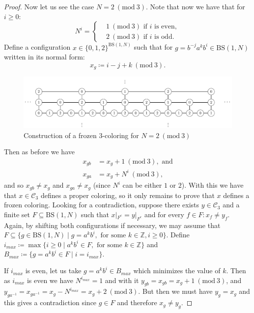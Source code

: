 \documentclass[cupthm,crop,info]{CUP-JNL-ETS}%
\theoremstyle{cupplain}
\theoremstyle{cupdefinition}
\theoremstyle{cupremark}
\theoremstyle{cupproof}
\newtheorem{proof}{Proof}
\numberwithin{equation}{section}
\newcommand{\BS}[1][N]{\mathrm{BS}(1,#1)}
\begin{document}
\begin{proof}
	
	Now let us see the case $N=2\ (\mathrm{mod} \ 3)$. Note that now we have that for $i\ge 0$:
	\begin{equation*}	
	N^i=\left\{ 
	\begin{aligned}
	&1 \ (\mathrm{mod} \ 3) \text{ if }i\text{ is even}, \\
	&2 \ (\mathrm{mod} \ 3) \text{ if }i\text{ is odd.} 
	\end{aligned}
	\right.
	\end{equation*}
	Define a configuration  $x\in \{0,1,2\}^{\BS}$ such that for $g=b^{-j}a^k b^i\in \BS$ written in its normal form:
	$$
	x_g\coloneqq i-j+k \ (\mathrm{mod} \ 3).
	$$
	
	
	\begin{figure}
		\centering
\includegraphics[scale=0.6]{frozen3_n2mod3.pdf}
		\caption{Construction of a frozen $3$-coloring for $N=2\ (\mathrm{mod} \ 3)$}
		\label{fig:gcs_frozen_3_col_N_2}
	\end{figure}	
	
	Then as before we have
	\begin{align*}
	x_{gb}&=x_g+1 \ (\mathrm{mod} \ 3), \text{ and} \\
	x_{ga}&=x_g+N^i \ (\mathrm{mod} \ 3),
	\end{align*}
	and so $x_{gb}\neq x_g$ and $x_{ga}\neq x_g$ (since $N^i$ can be either $1$ or $2$). With this we have that $x\in \mathcal{C}_3$ defines a proper coloring, so it only remains to prove that $x$ defines a frozen coloring. Looking for a contradiction, suppose there exists $y\in \mathcal{C}_3$ and a finite set $F\subseteq \BS$ such that $x|_{F^c}=y|_{F^c}$ and for every $f\in F: x_f\neq y_f$. Again, by shifting both configurations if necessary, we may assume that $F\subseteq \{g\in \BS\mid g=a^kb^i, \text{ for some }k\in \mathbb{Z}, i\ge 0\}$. Define $i_{max}\coloneqq \max\{ i\ge 0\mid a^kb^i\in F, \text{ for some }k\in \mathbb{Z}\}$ and $B_{max}\coloneqq\{g=a^kb^i\in F\mid i=i_{max}\}$.
	
	If $i_{max}$ is even, let us take $g=a^kb^i\in B_{max}$ which minimizes the value of $k$. Then as $i_{max}$ is even we have $N^{i_{max}}=1$ and with it $y_{gb}=x_{gb}=x_g+1  \ (\mathrm{mod} \ 3)$, and $y_{ga^{-1}}=x_{ga^{-1}}=x_g-N^{i_{max}} = x_g+2  \ (\mathrm{mod} \ 3)$. But then we must have $y_g=x_g$ and this gives a contradiction since $g\in F$ and therefore $x_g\neq y_g$.
	

\end{proof}
\end{document}
